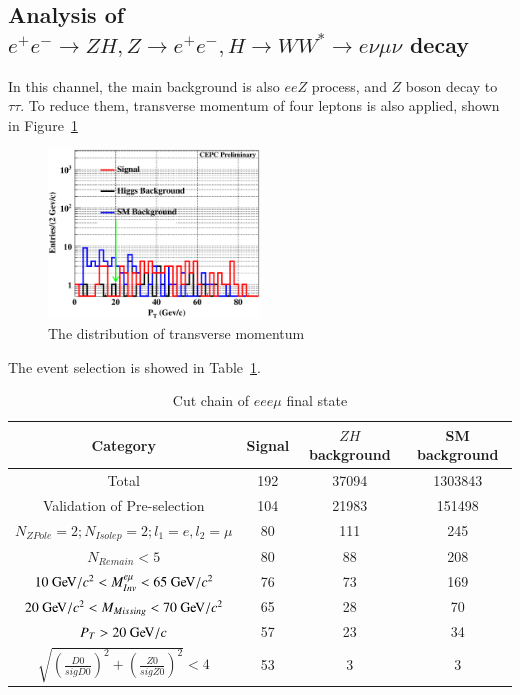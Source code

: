 \documentclass[11pt,a4paper]{cepcnote}
\begin{document}
\subsection{Analysis of $e^+e^- \to ZH, Z \to e^+e^-, H\to WW^* \to e\nu \mu\nu$ decay}
In this channel, the main background is also $eeZ$ process, and $Z$ boson decay to $\tau\tau$.
To reduce them, transverse momentum of four leptons is also applied, shown in Figure~\ref{fig:ptineeevuv}
\begin{figure}[H]
	\centering
	\includegraphics[width=0.5\textwidth]{e1e1H/evuv/ptineeevuv}
	\caption[]{The distribution of transverse momentum}
	\label{fig:ptineeevuv}
\end{figure}
The event selection is showed in Table~\ref{tab:eucutchain}.
\begin{table}[H]
  \begin{center}
    \begin{tabular}{cccc}
      \hline \hline
      \multicolumn{1}{c}{Category}&\multicolumn{1}{c}{Signal}&\multicolumn{1}{c}{$ZH$ background}&\multicolumn{1}{c}{SM background}\\ 
      \hline
      Total		       	 									&  192	& 37094	& 1303843\\
	  Validation of Pre-selection							&  104	& 21983	& 151498\\
      $N_{ZPole}=2; N_{Isolep}=2; l_1 = e, l_2 = \mu$	 	&  80	& 111	& 245\\
	  $N_{Remain} < 5$										&  80	& 88	& 208\\
	  $10\gev/c^2 < M_{Inv}^{e\mu} < 65\gev/c^2$	       	&  76	& 73	& 169	\\
	  $20\gev/c^2 < M_{Missing} < 70\gev/c^2$	        	&  65	& 28	& 70		\\
	  $P_{T} > 20\gev/c$									&  57	& 23	& 34		\\
	  $\sqrt{(\frac{D0}{sigD0})^2+(\frac{Z0}{sigZ0})^2} < 4$&  53 	& 3		& 3	\\
      \hline \hline
    \end{tabular}
   \caption[Monte Carlo purities in the single lepton sample]{Cut chain of $ee e\mu$ final state}
  \label{tab:eucutchain}
 \end{center}
\end{table}
\end{document}
